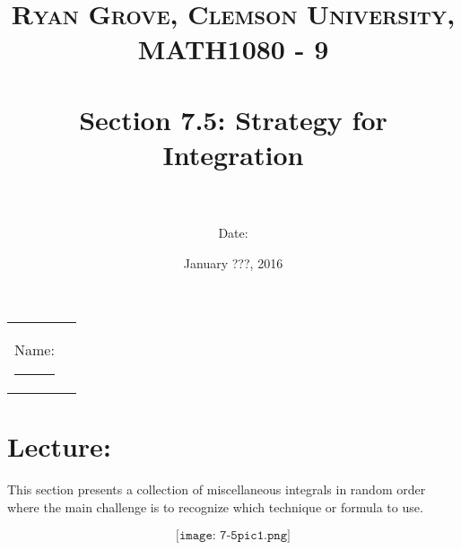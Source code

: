\documentclass[paper=a4, fontsize=11pt]{scrartcl} %
\title{	
\normalfont \normalsize 
\textsc{Ryan Grove, Clemson University, MATH1080 - 9} \\ [25pt] %
\horrule{0.5pt} \\[0.4cm] %
\huge Section 7.5: Strategy for Integration \\ %
\horrule{2pt} \\[0.5cm] %
}
\author{Date:} %
\date{\normalsize January ???, 2016} %
\numberwithin{equation}{section} %
\numberwithin{figure}{section} %
\numberwithin{table}{section} %
\begin{document}
\maketitle %

\begin{flushleft}
\begin{tabular}{l l}
Name: \rule{3.2in}{.01cm}  & {}%
\end{tabular}
\end{flushleft}


\section*{\textbf{Lecture:}}

This section presents a collection of miscellaneous integrals in random order where the main challenge is to recognize which technique or formula to use.\\
\indent

\[\texttt{[image: 7-5pic1.png]}\]
\indent\\

\newpage
\end{document}
